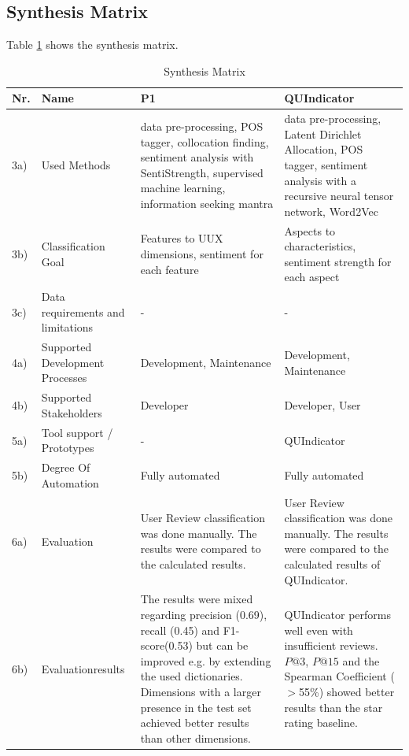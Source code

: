 \subsection{Synthesis Matrix}
Table \ref{tab:synthesisMatrix} shows the synthesis matrix.

\begin{table}[t]
    \centering
    \begin{small}
    \caption{Synthesis Matrix}
    \label{tab:synthesisMatrix}
    \setlength{\tabcolsep}{1em}
    \begin{tabular}{ p{} | p{3cm} | p{4cm} | p{4cm} }
    \hline
    \textbf{Nr.} & \textbf{Name} & \textbf{P1} & \textbf{QUIndicator}\\
    \hline
    \hline
    3a) & Used Methods & data pre-processing, POS tagger, collocation finding, sentiment analysis with SentiStrength, supervised machine learning, information seeking mantra & data pre-processing, Latent Dirichlet Allocation, POS tagger, sentiment analysis with a recursive neural tensor network, Word2Vec\\
    \hline
    3b) & Classification Goal & Features to UUX dimensions, sentiment for each feature & Aspects to characteristics, sentiment strength for each aspect\\
    \hline
    3c) & Data requirements and limitations & - & - \\
    \hline
    4a) & Supported Development Processes & Development, Maintenance & Development, Maintenance\\    \hline
    4b) & Supported Stakeholders & Developer & Developer, User\\
    \hline
    5a) & Tool support / Prototypes & - & QUIndicator \\
    \hline
    5b) & Degree Of Automation & Fully automated & Fully automated \\
    \hline
    6a) & Evaluation & User Review classification was done manually. The results were compared to the calculated results. & User Review classification was done manually. The results were compared to the calculated results of QUIndicator. \\
    \hline
    6b) & Evaluationresults & The results were mixed regarding precision (0.69), recall (0.45) and F1-score(0.53) but can be improved e.g. by extending the used dictionaries. Dimensions with a larger presence in the test set achieved better results than other dimensions. & QUIndicator performs well even with insufficient reviews. $P@3$, $P@15$ and the Spearman Coefficient ($>$55\%) showed better results than the star rating baseline. \\
    \hline
    \end{tabular}
    \end{small}
\end{table}

